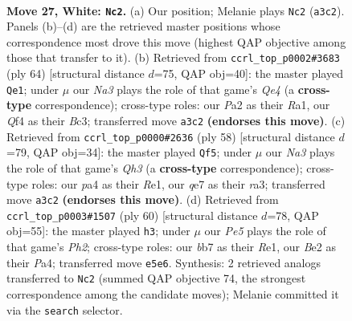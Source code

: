 \documentclass[11pt]{article}
\begin{document}
\clearpage

\begin{figure}[p]\centering
\begin{subfigure}{0.46\textwidth}\centering
\resizebox{\linewidth}{!}{%
\newchessgame
\chessboard[
  setfen={r2k2nr/1b2q3/8/4Pp2/pp1p1Q1p/N6P/P3B1P1/2R3KR w - - 0 27},
  showmover=false,
  pgfstyle=straightmove, color=movearrow, markmove={a3-c2}
]}
\caption{}
\end{subfigure}\hfill
\begin{subfigure}{0.46\textwidth}\centering
\resizebox{\linewidth}{!}{%
\newchessgame
\chessboard[
  setfen={2r2r1k/2q3p1/1b1p3p/1P2p3/R1P1Q3/2B2NnP/5PP1/R5K1 w - - 9 33},
  showmover=false,
  pgfstyle=straightmove, color=movearrow, markmove={e4-e1}
]}
\caption{}
\end{subfigure}
\\[4pt]
\begin{subfigure}{0.46\textwidth}\centering
\resizebox{\linewidth}{!}{%
\newchessgame
\chessboard[
  setfen={4r1k1/p2p1qpp/5P2/1P4P1/1P2pn2/r3N2Q/7P/4R1RK w - - 0 30},
  showmover=false,
  pgfstyle=straightmove, color=movearrow, markmove={h3-f5}
]}
\caption{}
\end{subfigure}\hfill
\begin{subfigure}{0.46\textwidth}\centering
\resizebox{\linewidth}{!}{%
\newchessgame
\chessboard[
  setfen={B6k/4n2p/8/2bpp2r/P4p1q/2P5/5PPP/1R1QR2K w - - 3 31},
  showmover=false,
  pgfstyle=straightmove, color=movearrow, markmove={h2-h3}
]}
\caption{}
\end{subfigure}
\caption{\textbf{Move 27, White: \texttt{Nc2}.} (a) Our position; Melanie plays \texttt{Nc2} (\texttt{a3c2}). Panels (b)--(d) are the retrieved master positions whose correspondence most drove this move (highest QAP objective among those that transfer to it). (b) Retrieved from \texttt{ccrl\_top\_p0002\#3683} (ply 64) [structural distance $d$=75, QAP obj=40]: the master played \texttt{Qe1}; under $\mu$ our \emph{Na3} plays the role of that game's \emph{Qe4} (a \textbf{cross-type} correspondence); cross-type roles: our \emph{P}a2 as their \emph{R}a1, our \emph{Q}f4 as their \emph{B}c3; transferred move \texttt{a3c2} \textbf{(endorses this move)}. (c) Retrieved from \texttt{ccrl\_top\_p0000\#2636} (ply 58) [structural distance $d$=79, QAP obj=34]: the master played \texttt{Qf5}; under $\mu$ our \emph{Na3} plays the role of that game's \emph{Qh3} (a \textbf{cross-type} correspondence); cross-type roles: our \emph{p}a4 as their \emph{R}e1, our \emph{q}e7 as their \emph{r}a3; transferred move \texttt{a3c2} \textbf{(endorses this move)}. (d) Retrieved from \texttt{ccrl\_top\_p0003\#1507} (ply 60) [structural distance $d$=78, QAP obj=55]: the master played \texttt{h3}; under $\mu$ our \emph{Pe5} plays the role of that game's \emph{Ph2}; cross-type roles: our \emph{b}b7 as their \emph{R}e1, our \emph{B}e2 as their \emph{P}a4; transferred move \texttt{e5e6}. Synthesis: 2 retrieved analogs transferred to \texttt{Nc2} (summed QAP objective 74, the strongest correspondence among the candidate moves); Melanie committed it via the \texttt{search} selector.}
\label{fig:thought-m52}
\end{figure}
\end{document}
